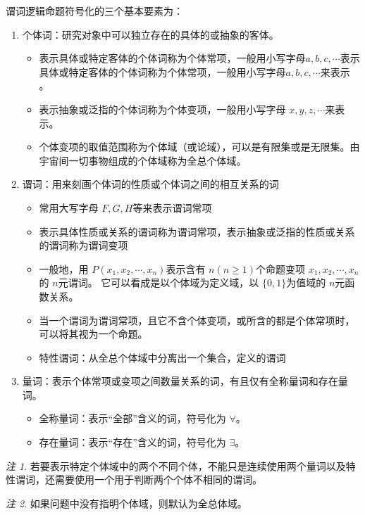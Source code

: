 \documentclass[a4paper,11pt]{article}%
\theoremstyle{remark}
\newtheorem*{remark}{注}
\theoremstyle{remark}
\theoremstyle{definition}
\theoremstyle{definition}
\theoremstyle{plain}
\begin{document}
谓词逻辑命题符号化的三个基本要素为：
\begin{enumerate}
    \item 个体词：研究对象中可以独立存在的具体的或抽象的客体。
    \begin{itemize}
        \item 表示具体或特定客体的个体词称为个体常项，一般用小写字母$a,b,c,\cdots$表示具体或特定客体的个体词称为个体常项，一般用小写字母$a,b,c,\cdots$来表示 。
        \item  表示抽象或泛指的个体词称为个体变项，一般用小写字母 $x,y,z,\cdots$来表示。
        \item 个体变项的取值范围称为个体域（或论域），可以是有限集或是无限集。由宇宙间一切事物组成的个体域称为全总个体域。
    \end{itemize}
    \item 谓词：用来刻画个体词的性质或个体词之间的相互关系的词
    \begin{itemize}
        \item 常用大写字母 $F,G,H$等来表示谓词常项
        \item 表示具体性质或关系的谓词称为谓词常项，表示抽象或泛指的性质或关系的谓词称为谓词变项
        \item 一般地，用 $P(x_1,x_2,\cdots,x_n)$表示含有 $n(n\geq 1)$个命题变项 $x_1,x_2,\cdots,x_n$的 $n$元谓词。
        它可以看成是以个体域为定义域，以 $\{0,1\}$为值域的 $n$元函数关系。
        \item 当一个谓词为谓词常项，且它不含个体变项，或所含的都是个体常项时，可以将其视为一个命题。 
        \item 特性谓词：从全总个体域中分离出一个集合，定义的谓词
    \end{itemize}
    \item 量词：表示个体常项或变项之间数量关系的词，有且仅有全称量词和存在量词。
    \begin{itemize}
        \item 全称量词：表示“全部”含义的词，符号化为 $\forall$。
        \item 存在量词：表示“存在”含义的词，符号化为 $\exists$。
    \end{itemize}
\end{enumerate}
\begin{remark}
    若要表示特定个体域中的两个不同个体，不能只是连续使用两个量词以及特性谓词，还需要使用一个用于判断两个个体不相同的谓词。
\end{remark}
\begin{remark}
    如果问题中没有指明个体域，则默认为全总体域。
\end{remark}
\end{document}
